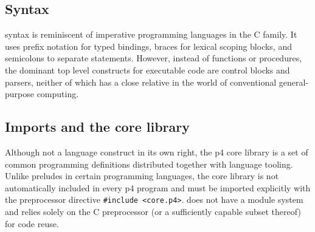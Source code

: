 
\subsection{Syntax}




\pfs syntax is reminiscent of imperative programming languages in the C family.
It uses prefix notation for typed bindings, braces for lexical scoping blocks,
and semicolons to separate statements. However, instead of functions or
procedures, the dominant top level constructs for executable code are control
blocks and parsers, neither of which has a close relative in the world of conventional general-purpose computing.

\subsection*{Imports and the core library}

Although not a language construct in its own right, the \acrshort{p4} core
library is a set of common programming definitions distributed together with
language tooling. Unlike preludes in certain programming languages, the core
library is not automatically included in every \acrshort{p4} program and must be
imported explicitly with the preprocessor directive \texttt{\#include
<core.p4>}. \pfs does not have a module system and relies solely on the C
preprocessor (or a sufficiently capable subset thereof) for code reuse.

